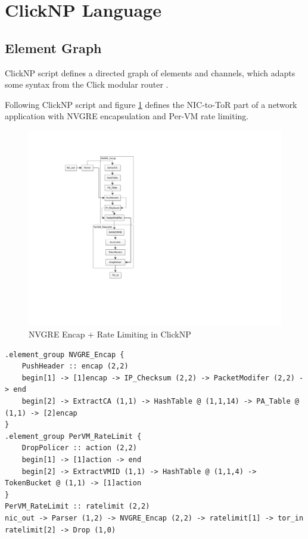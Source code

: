 \section{ClickNP Language}
\label{sec:language}

\subsection{Element Graph}

ClickNP script defines a directed graph of elements and channels, which adapts some syntax from the Click modular router \cite{kohler2000click}.

Following ClickNP script and figure \ref{fig:ClickNPScriptExample} defines the NIC-to-ToR part of a network application with NVGRE encapsulation and Per-VM rate limiting.

\begin{figure}[!t]
	\centering
	\includegraphics[width=1.0\columnwidth]{image/ApplicationExample}
	\vspace{-0.25in}
	\caption{NVGRE Encap + Rate Limiting in ClickNP}
	\vspace{-0.15in}
	\label{fig:ClickNPScriptExample}
\end{figure}

\begin{lstlisting}
.element_group NVGRE_Encap {
    PushHeader :: encap (2,2)
    begin[1] -> [1]encap -> IP_Checksum (2,2) -> PacketModifer (2,2) -> end
    begin[2] -> ExtractCA (1,1) -> HashTable @ (1,1,14) -> PA_Table @ (1,1) -> [2]encap
}
.element_group PerVM_RateLimit {
    DropPolicer :: action (2,2)
    begin[1] -> [1]action -> end
    begin[2] -> ExtractVMID (1,1) -> HashTable @ (1,1,4) -> TokenBucket @ (1,1) -> [1]action
}
PerVM_RateLimit :: ratelimit (2,2)
nic_out -> Parser (1,2) -> NVGRE_Encap (2,2) -> ratelimit[1] -> tor_in
ratelimit[2] -> Drop (1,0)
\end{lstlisting}

